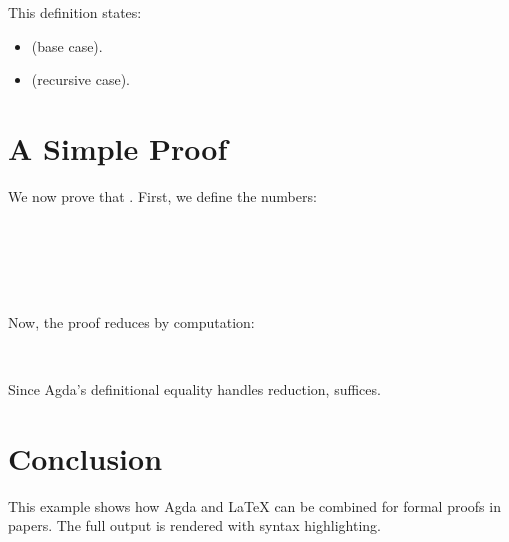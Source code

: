 This definition states:
\begin{itemize}
  \item {} (base case).
  \item {} (recursive case).
\end{itemize}

\section{A Simple Proof}
We now prove that . First, we define the numbers:

\begin{code}%
\>[0]\AgdaSpace{}%
\AgdaSymbol{:}\AgdaSpace{}%
\<%
\\
\>[0]\AgdaSpace{}%
\AgdaSymbol{=}\AgdaSpace{}%
\AgdaSpace{}%
\AgdaSymbol{(}\AgdaSpace{}%
\AgdaSymbol{)}\<%
\\
%
\\[\AgdaEmptyExtraSkip]%
\>[0]\AgdaSpace{}%
\AgdaSymbol{:}\AgdaSpace{}%
\<%
\\
\>[0]\AgdaSpace{}%
\AgdaSymbol{=}\AgdaSpace{}%
\AgdaSpace{}%
\AgdaSymbol{(}\AgdaSpace{}%
\AgdaSymbol{(}\AgdaSpace{}%
\AgdaSymbol{(}\AgdaSpace{}%
\AgdaSymbol{)))}\<%
\end{code}

Now, the proof reduces by computation:

\begin{code}%
\>[0]\AgdaSpace{}%
\AgdaSymbol{:}\AgdaSpace{}%
\AgdaSpace{}%
\AgdaOperator{\AgdaFunction{+}}\AgdaSpace{}%
\AgdaSpace{}%
\AgdaSpace{}%
\<%
\\
\>[0]\AgdaSpace{}%
\AgdaSymbol{=}\AgdaSpace{}%
\<%
\end{code}

Since Agda's definitional equality handles reduction,  suffices.

\section{Conclusion}
This example shows how Agda and LaTeX can be combined for formal proofs in papers. The full output is rendered with syntax highlighting.
